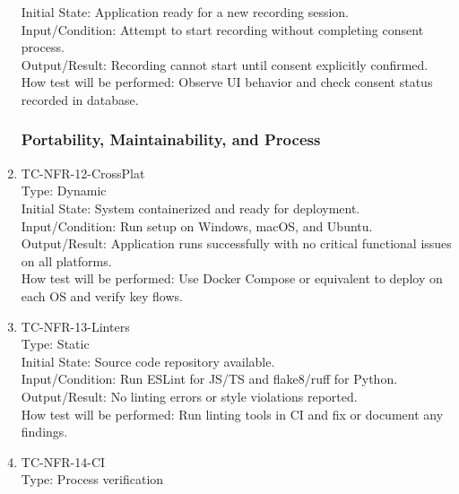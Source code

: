 \documentclass[12pt, titlepage]{article}
\begin{document}
\begin{enumerate}
Initial State: Application ready for a new recording session.\\

Input/Condition: Attempt to start recording without completing consent process.\\

Output/Result: Recording cannot start until consent explicitly confirmed.\\

How test will be performed: Observe UI behavior and check consent status recorded in database.

\subsubsection{Portability, Maintainability, and Process}

\item{TC-NFR-12-CrossPlat\\}
Type: Dynamic\\

Initial State: System containerized and ready for deployment.\\

Input/Condition: Run setup on Windows, macOS, and Ubuntu.\\

Output/Result: Application runs successfully with no critical functional issues on all platforms.\\

How test will be performed: Use Docker Compose or equivalent to deploy on each OS and verify key flows.

\item{TC-NFR-13-Linters\\}
Type: Static\\

Initial State: Source code repository available.\\

Input/Condition: Run ESLint for JS/TS and flake8/ruff for Python.\\

Output/Result: No linting errors or style violations reported.\\

How test will be performed: Run linting tools in CI and fix or document any findings.

\item{TC-NFR-14-CI\\}
Type: Process verification


\end{enumerate}
\end{document}
